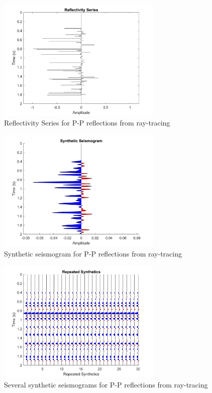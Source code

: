 \documentclass[12pt]{article}
\begin{document}
\begin{figure}[!htb]
	\centering
	\includegraphics[width=0.7\textwidth]{Figures/RTCrefseriesPP.png}
	\caption[Fox Creek ray-tracing P-P reflectivity series]{Reflectivity Series for P-P reflections from ray-tracing}
	\label{fig:RTCrefseriesPP}
\end{figure}	

\begin{figure}[!htb]
	\centering
	\includegraphics[width=0.7\textwidth]{Figures/RTCsyntheticPP.png}
	\caption[Fox Creek ray-tracing P-P synthetic seismogram]{Synthetic seismogram for P-P reflections from ray-tracing}
	\label{fig:RTCsyntheticPP}
\end{figure}	

\begin{figure}[!htb]
	\centering
	\includegraphics[width=0.7\textwidth]{Figures/RTCSeveralSyntheticsPP.png}
	\caption[Fox Creek ray-tracing several P-P synthetic seismograms]{Several synthetic seismograms for P-P reflections from ray-tracing}
	\label{fig:RTCSeveralSyntheticsPP}
\end{figure}	
\end{document}
